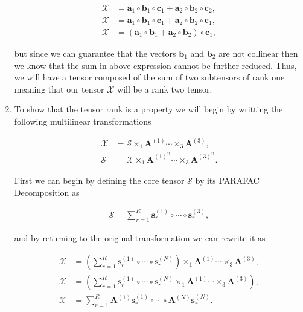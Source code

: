 \documentclass[a4paper,10pt]{article}
\begin{document}
\begin{enumerate}
        \begin{align}
            \mathcal{X} &= \boldsymbol{a}_{1} \circ \boldsymbol{b}_{1} \circ \boldsymbol{c}_{1} + \boldsymbol{a}_{2} \circ \boldsymbol{b}_{2} \circ \boldsymbol{c}_{2}, \\
            \mathcal{X} &= \boldsymbol{a}_{1} \circ \boldsymbol{b}_{1} \circ \boldsymbol{c}_{1} + \boldsymbol{a}_{2} \circ \boldsymbol{b}_{2} \circ \boldsymbol{c}_{1}, \\
            \mathcal{X} &= (\boldsymbol{a}_{1} \circ \boldsymbol{b}_{1} + \boldsymbol{a}_{2} \circ \boldsymbol{b}_{2}) \circ \boldsymbol{c}_{1},
        \end{align}

        but since we can guarantee that the vectors $\boldsymbol{b}_{1}$ and $\boldsymbol{b}_{2}$ are not collinear then we know that the sum in above expression cannot be further reduced. Thus, we will have a tensor 
        composed of the sum of two subtensors of rank one meaning that our tensor $\mathcal{X}$  will be a rank two tensor.

    \item To show that the tensor rank is a property we will begin by writting the following multilinear transformations
    
        \begin{align}
            \mathcal{X} &= \mathcal{S} \times_{1} \boldsymbol{A}^{(1)} \cdots \times_{3} \boldsymbol{A}^{(3)}, \\
            \mathcal{S} &= \mathcal{X} \times_{1} \boldsymbol{A}^{(1)^{\text{H}}} \cdots \times_{3} \boldsymbol{A}^{(3)^{\text{H}}}.
        \end{align}

        First we can begin by defining the core tensor $\mathcal{S}$ by its PARAFAC Decomposition as

        \begin{align}
            \mathcal{S} = \sum^{R}_{r = 1} \boldsymbol{s}^{(1)}_{r} \circ \cdots \circ \boldsymbol{s}^{(3)}_{r},
        \end{align}

        and by returning to the original transformation we can rewrite it as 

        \begin{align}
            \mathcal{X} &= \left(\sum^{R}_{r = 1} \boldsymbol{s}^{(1)}_{r} \circ \cdots \circ \boldsymbol{s}^{(N)}_{r}\right) \times_{1} \boldsymbol{A}^{(1)} \cdots \times_{3} \boldsymbol{A}^{(3)}, \\
            \mathcal{X} &= \left(\sum^{R}_{r = 1} \boldsymbol{s}^{(1)}_{r} \circ \cdots \circ \boldsymbol{s}^{(N)}_{r} \times_{1} \boldsymbol{A}^{(1)} \cdots \times_{3} \boldsymbol{A}^{(3)}\right), \\
            \mathcal{X} &= \sum^{R}_{r = 1} \boldsymbol{A}^{(1)} \boldsymbol{s}^{(1)}_{r} \circ \cdots \circ \boldsymbol{A}^{(N)} \boldsymbol{s}^{(N)}_{r}.
        \end{align}


\end{enumerate}
\end{document}
